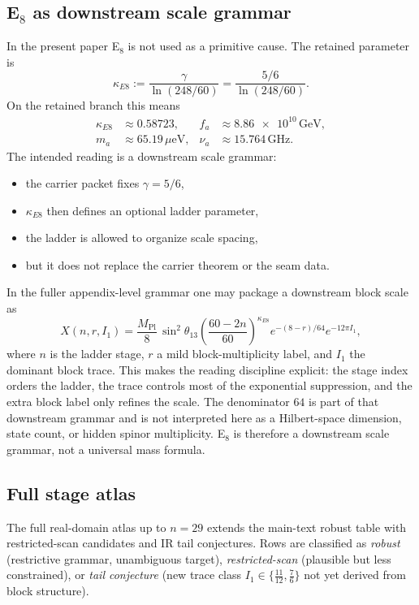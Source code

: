 \documentclass[11pt,a4paper]{article}
\theoremstyle{definition}
\theoremstyle{remark}
\newcommand{\Mplunred}{M_{\mathrm{Pl}}}
\begin{document}
\subsection{\texorpdfstring{E$_8$}{E8} as downstream scale grammar}

In the present paper E$_8$ is not used as a primitive cause. The retained parameter is
\[
\kappa_{E8}:=\frac{\gamma}{\ln(248/60)}=\frac{5/6}{\ln(248/60)}.
\]
On the retained branch this means
\[
\begin{aligned}
\kappa_{E8}&\approx \num{0.58723},
&
f_a&\approx \num{8.86e10}\,\mathrm{GeV},
\\
m_a&\approx \num{65.19}\,\mu\mathrm{eV},
&
\nu_a&\approx \num{15.764}\,\mathrm{GHz}.
\end{aligned}
\]
The intended reading is a downstream scale grammar:
\begin{itemize}[leftmargin=1.5em, topsep=3pt, itemsep=2pt]
    \item the carrier packet fixes $\gamma=5/6$,
    \item $\kappa_{E8}$ then defines an optional ladder parameter,
    \item the ladder is allowed to organize scale spacing,
    \item but it does not replace the carrier theorem or the seam data.
\end{itemize}
In the fuller appendix-level grammar one may package a downstream block scale as
\[
X(n,r,I_1)=\frac{\Mplunred}{8}\,\sin^2\theta_{13}
\left(\frac{60-2n}{60}\right)^{\kappa_{E8}}
e^{-(8-r)/64}e^{-12\pi I_1},
\]
where $n$ is the ladder stage, $r$ a mild block-multiplicity label, and $I_1$ the dominant block trace. This makes the reading discipline explicit: the stage index orders the ladder, the trace controls most of the exponential suppression, and the extra block label only refines the scale. The denominator $64$ is part of that downstream grammar and is not interpreted here as a Hilbert-space dimension, state count, or hidden spinor multiplicity. E$_8$ is therefore a downstream scale grammar, not a universal mass formula.

\subsection{Full stage atlas}

The full real-domain atlas up to $n=29$ extends the main-text robust table with restricted-scan candidates and IR tail conjectures. Rows are classified as \emph{robust} (restrictive grammar, unambiguous target), \emph{restricted-scan} (plausible but less constrained), or \emph{tail conjecture} (new trace class $I_1\in\{\frac{11}{12},\frac{7}{6}\}$ not yet derived from block structure).
\end{document}
